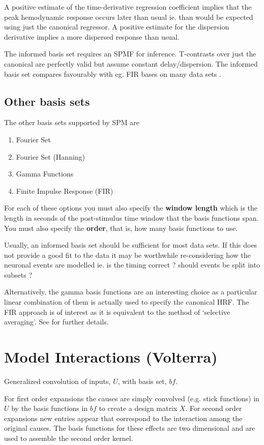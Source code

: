 \documentclass[a4paper,titlepage]{book}
\begin{document}
A positive estimate of the time-derivative regression coefficient implies that the peak 
hemodynamic response occurs later than usual ie. than
would be expected using just the canonical regressor. 
A positive estimate for the dispersion derivative implies
a more dispersed response than usual.

The informed basis set requires an SPM{F} for inference. T-contrasts over just the canonical are perfectly valid but assume constant delay/dispersion. The informed basis set compares favourably with eg. FIR bases on many data sets \cite{rnah_basis}.

\subsection{Other basis sets}

The other basis sets supported by SPM are
\begin{enumerate}

\item{Fourier Set}
\item{Fourier Set (Hanning)}
\item{Gamma Functions}
\item{Finite Impulse Response (FIR)}
\end{enumerate}

For each of these options you must also specify the 
{\bf window length} which is the length in seconds of the 
post-stimulus time window that the basis functions 
span. You must also specify the {\bf order}, that is, how many
basis functions to use.

Usually, an informed basis set should be sufficient for 
most data sets. If this does not provide a good fit to the 
data it may be worthwhile re-considering how the neuronal events
are modelled ie. is the timing correct ? should events be split into 
subsets ? 

Alternatively, the gamma basis functions are an interesting choice 
as a particular linear combination of them is actually used to 
specify the canonical HRF. The FIR approach is of interest as it 
is equivalent to the method of `selective averaging'. See 
\cite{rnah_conv} for further details. 

\section{Model Interactions (Volterra)}
Generalized convolution of inputs, $U$, with basis set, $bf$.

For first order expansions the causes are simply convolved (e.g. stick functions) in $U$ by the basis functions in $bf$ to create a design matrix $X$.  For second order expansions new entries appear that correspond to the interaction among the original causes. The basis functions for these effects are two dimensional and are used to assemble the second order kernel. 
\end{document}
